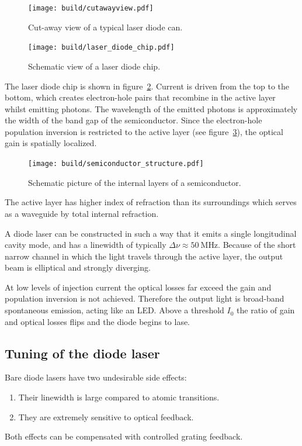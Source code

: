 \begin{figure}[ht]
  \centering
  \texttt{[image: build/cutawayview.pdf]}
  \caption{Cut-away view of a typical laser diode can\cite{anleitung}.}%
  \label{fig:cutawayview}
\end{figure}

\begin{figure}[ht]
  \centering
  \texttt{[image: build/laser\_diode\_chip.pdf]}
  \caption{Schematic view of a laser diode chip\cite{anleitung}.}%
  \label{fig:laser_diode_chip}
\end{figure}

The laser diode chip is shown in figure~\ref{fig:laser_diode_chip}.
Current is driven from the top to the bottom, which creates electron-hole pairs that
recombine in the active layer whilst emitting photons.
The wavelength of the emitted photons is approximately the width of the band gap of the semiconductor.
Since the electron-hole population inversion is restricted to the active layer (see
figure~\ref{fig:semiconductor_structure}),
the optical gain is spatially localized.

\begin{figure}[ht]
  \centering
  \texttt{[image: build/semiconductor\_structure.pdf]}
  \caption{Schematic picture of the internal layers of a semiconductor\cite{anleitung}.}%
  \label{fig:semiconductor_structure}
\end{figure}

The active layer has higher index of refraction than its surroundings
which serves as a waveguide by total internal refraction.

A diode laser can be constructed in such a way that it emits a single longitudinal cavity mode,
and has a linewidth of typically $\Delta \nu \approx \SI{50}{\mega\hertz}$.
Because of the short narrow channel in which the light travels through the active layer,
the output beam is elliptical and strongly diverging.

At low levels of injection current the optical losses far exceed the gain and population inversion
is not achieved.
Therefore the output light is broad-band spontaneous emission, acting like an LED.
Above a threshold $I_0$ the ratio of gain and optical losses flips and the diode begins to lase.

\subsection{Tuning of the diode laser}\label{tuning-of-the-diode-laser}
Bare diode lasers have two undesirable side effects:
\begin{enumerate}
  \item Their linewidth is large compared to atomic transitions.
  \item They are extremely sensitive to optical feedback.
\end{enumerate}
Both effects can be compensated with controlled grating feedback.

